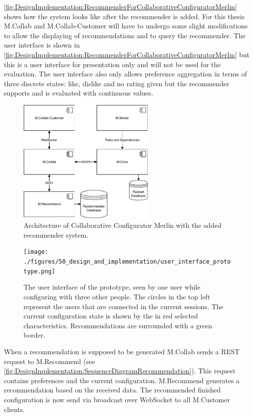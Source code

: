 \autoref{fig:DesignImplementation:RecommenderForCollaborativeConfiguratorMerlin} shows how the system looks like after the recommender is added. For this thesis M.Collab and M.Collab-Customer will have to undergo some slight modifications to allow the displaying of recommendations and to query the recommender. The user interface is shown in \autoref{fig:DesignImplementation:RecommenderForCollaborativeConfiguratorMerlin} but this is a user interface for presentation only and will not be used for the evaluation. The user interface also only allows preference aggregation in terms of three discrete states: like, dislike and no rating given but the recommender supports and is evaluated with continuous values.

\begin{figure}
    \centering
    \includegraphics[width=0.6\textwidth]{./figures/50_design_and_implementation/MerlinCollabRecommender.pdf}
    \caption{Architecture of Collaborative Configurator Merlin with the added recommender system.}
    \label{fig:DesignImplementation:RecommenderForCollaborativeConfiguratorMerlin}
\end{figure}

\begin{figure}
    \centering
    \texttt{[image: ./figures/50\_design\_and\_implementation/user\_interface\_prototype.png]}
    \caption{The user interface of the prototype, seen by one user while configuring with three other people. The circles in the top left represent the users that are connected in the current sessions. The current configuration state is shown by the in red selected characteristics. Recommendations are surrounded with a green border.}
    \label{fig:DesignImplementation:UserInterface}
\end{figure}

When a recommendation is supposed to be generated M.Collab sends a REST request to M.Recommend (see \autoref{fig:DesignImplementation:SequenceDiagramRecommendation}). This request contains preferences and the current configuration. M.Recommend generates a recommendation based on the received data. The recommended finished configuration is now send via broadcast over WebSocket to all M.Customer clients. 


